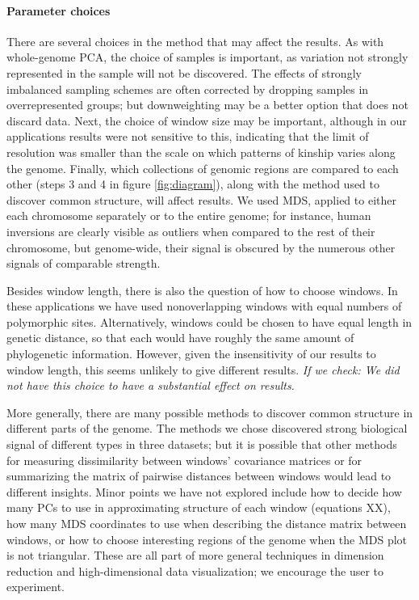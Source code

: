 \documentclass[11pt, oneside]{article}   	%
\newcommand{\plr}[1]{{\em \color{blue} #1}}
\begin{document}
\paragraph{Parameter choices}
There are several choices in the method that may affect the results.
As with whole-genome PCA,
the choice of samples is important,
as variation not strongly represented in the sample will not be discovered.
The effects of strongly imbalanced sampling schemes are often corrected by dropping samples in overrepresented groups;
but downweighting may be a better option that does not discard data.
Next, the choice of window size may be important,
although in our applications results were not sensitive to this,
indicating that the limit of resolution was smaller than the scale on which patterns of kinship varies along the genome.
Finally, which collections of genomic regions are compared to each other (steps 3 and 4 in figure \ref{fig:diagram}),
along with the method used to discover common structure,
will affect results.
We used MDS, applied to either each chromosome separately or to the entire genome;
for instance, human inversions are clearly visible as outliers when compared to the rest of their chromosome,
but genome-wide, their signal is obscured by the numerous other signals of comparable strength.

Besides window length, there is also the question of how to choose windows.
In these applications we have used nonoverlapping windows with equal numbers of polymorphic sites.
Alternatively, windows could be chosen to have equal length in genetic distance,
so that each would have roughly the same amount of phylogenetic information.
However, given the insensitivity of our results to window length,
this seems unlikely to give different results.
\plr{If we check: We did not have this choice to have a substantial effect on results.}

More generally, there are many possible methods to discover common structure in different parts of the genome.
The methods we chose discovered strong biological signal of different types in three datasets;
but it is possible that other methods for measuring dissimilarity between windows' covariance matrices
or for summarizing the matrix of pairwise distances between windows
would lead to different insights.
Minor points we have not explored include how to decide how many PCs to use in approximating structure of each window
(equations XX),
how many MDS coordinates to use when describing the distance matrix between windows,
or how to choose interesting regions of the genome when the MDS plot is not triangular.
These are all part of more general techniques in dimension reduction and high-dimensional data visualization;
we encourage the user to experiment.
\end{document}

